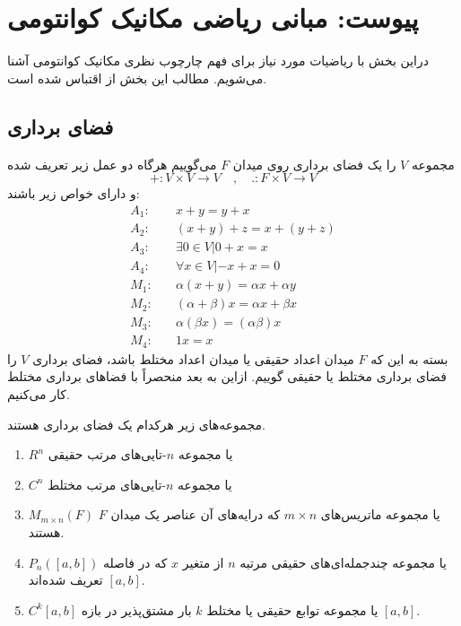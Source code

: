 \section{پیوست: مبانی ریاضی مکانیک کوانتومی}\label{chapter7}
دراین بخش با ریاضیات مورد نیاز برای فهم چارچوب نظری مکانیک کوانتومی آشنا می‌شویم.  مطالب این بخش از  \cite{ 
 		wolf19,
 		qis,
 		nielsen10,
 		strang11
 		}
اقتباس شده است.

  \subsection{فضای برداری}
  مجموعه $V$ را یک فضای برداری روی میدان $F$ می‌گوییم هرگاه دو عمل زیر تعریف شده 
  \begin{equation}
  	+ : V \times V \rightarrow V \quad , \quad . : F \times V \rightarrow V
  \end{equation}
  و دارای خواص زیر باشند: 
   \begin{equation}
   \begin{split}
   A_{1}: & \quad x + y = y + x\\
   A_{2}: & \quad (x + y) + z = x + (y + z)\\
   A_{3}: & \quad \exists 0 \in V | 0 + x = x\\
   A_{4}: & \quad \forall x \in V | -x + x = 0\\
   M_{1}: & \quad \alpha(x+y) = \alpha x + \alpha y\\
   M_{2}: & \quad (\alpha + \beta)x = \alpha x + \beta x\\
   M_{3}: & \quad \alpha(\beta x) = (\alpha\beta) x\\
   M_{4}: & \quad 1x = x
   \end{split}
   \end{equation}
   بسته به این که $F$ میدان اعداد حقیقی یا میدان اعداد مختلط باشد، فضای برداری $V$ را فضای برداری مختلط یا حقیقی گوییم. ازاین به بعد منحصراً با فضاهای برداری مختلط کار می‌کنیم. 
   
\begin{example}
مجموعه‌های زیر هرکدام یک فضای برداری هستند. 
\begin{enumerate}
	\item $R^{n}$ یا مجموعه $n$-تایی‌های مرتب حقیقی
	\item $C^{n}$ یا مجموعه $n$-تایی‌های مرتب مختلط
	\item $M_{m \times n}(F)$ یا مجموعه ماتریس‌های $m \times n$ که درایه‌های آن عناصر یک میدان $F$ هستند.
	\item $P_{n}([a,b])$ یا مجموعه چندجمله‌ای‌های حقیقی مرتبه $n$ از متغیر $x$ که در فاصله $[a,b]$ تعریف شده‌اند. 
	\item $C^{k}[a,b]$ یا مجموعه توابع حقیقی یا مختلط $k$ بار مشتق‌پذیر در بازه $[a,b]$.
\end{enumerate}  
\end{example} 
   
